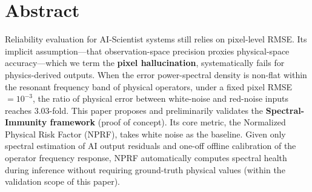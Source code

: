 \documentclass[9pt,twocolumn]{article}
\theoremstyle{remark}
\theoremstyle{definition}
\begin{document}

\section*{Abstract}
\vspace{-2pt}
\begingroup
\scriptsize
\setlength{\parindent}{0.7em}

Reliability evaluation for AI-Scientist systems still relies on pixel-level RMSE. Its implicit assumption---that observation-space precision proxies physical-space accuracy---which we term the \textbf{pixel hallucination}, systematically fails for physics-derived outputs. When the error power-spectral density is non-flat within the resonant frequency band of physical operators, under a fixed pixel RMSE $=10^{-3}$, the ratio of physical error between white-noise and red-noise inputs reaches 3.03-fold. This paper proposes and preliminarily validates the \textbf{Spectral-Immunity framework} (proof of concept). Its core metric, the Normalized Physical Risk Factor (NPRF), takes white noise as the baseline. Given only spectral estimation of AI output residuals and one-off offline calibration of the operator frequency response, NPRF automatically computes spectral health during inference without requiring ground-truth physical values (within the validation scope of this paper).
\end{document}
